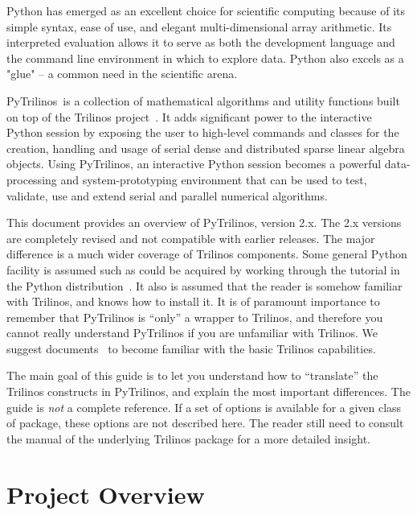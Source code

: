 \documentclass[10pt,relax]{SANDreport}
\newcommand{\PyTrilinos}{{PyTrilinos}}
\begin{document}
Python has emerged as an excellent choice for scientific computing because of
its simple syntax, ease of use, and elegant multi-dimensional array
arithmetic. Its interpreted evaluation allows it to serve as both the
development language and the command line environment in which to explore
data. Python also excels as a "glue" -- a common need in the scientific arena.

\PyTrilinos\ is a collection of mathematical algorithms and utility functions
built on top of the Trilinos project~\cite{Trilinos-home-page}.  It adds
significant power to the interactive Python session by exposing the user to
high-level commands and classes for the creation, handling and usage of serial
dense and distributed sparse linear algebra objects. Using \PyTrilinos, an
interactive Python session becomes a powerful data-processing and
system-prototyping environment that can be used to test, validate, use and
extend serial and parallel numerical algorithms.

\smallskip

This document provides an overview of \PyTrilinos, version 2.x.  The 2.x
versions are completely revised and not compatible with earlier releases. The
major difference is a much wider coverage of Trilinos components. Some general
Python facility is assumed such as could be acquired by working through the
tutorial in the Python distribution~\cite{python-tutorial}.  It also is
assumed that the reader is somehow familiar with Trilinos, and knows how to
install it.  It is of paramount importance to remember that PyTrilinos is
``only'' a wrapper to Trilinos, and therefore you cannot really understand
PyTrilinos if you are unfamiliar with Trilinos.  We suggest
documents~\cite{Trilinos-tutorial} to become familiar with the basic Trilinos
capabilities.

The main goal of this guide is to let you understand how to ``translate'' the
Trilinos constructs in PyTrilinos, and explain the most important differences.
The guide is {\sl not} a complete reference. If a set of options is available
for a given class of package, these options are not described here. The reader
still need to consult the manual of the underlying Trilinos package for a more
detailed insight.


\section{Project Overview}
\label{sec:overview}
\end{document}
